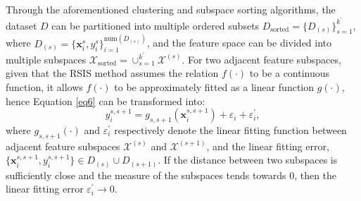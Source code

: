 \documentclass[final,3p,times]{elsarticle}
\begin{document}
Through the aforementioned clustering and subspace sorting 
algorithms, the dataset $D$ can be partitioned into multiple 
ordered subsets $D_{\text{sorted}}=\{D_{(s)}\}_{s=1}^{k^\prime}$, 
where $D_{(s)}=\{ \boldsymbol{x}_i^s,y_i^s \}_{i=1}^{\text{num}
(D_{(s)})}$, and the feature space can be divided into multiple 
subspaces $\mathcal{X}_{\text{sorted}}=\cup_{s=1}^{k^\prime}\mathcal{X}^{(s)}$. For 
two adjacent feature subspaces, given that the RSIS method assumes 
the relation $f(\cdot)$ to be a continuous function, it allows 
$f(\cdot)$ to be approximately fitted as a linear function 
$g(\cdot)$, hence Equation \eqref{eq6} can be transformed into: 
\begin{equation} 
\label{eq7}
y_i^{s,s+1}=g_{s,s+1}(\boldsymbol{x}_i^{s,s+1})+\varepsilon_i+
\varepsilon_i^\prime, 
\end{equation}
where $g_{s,s+1}(\cdot)$ and $\varepsilon_i^\prime$ respectively 
denote the linear fitting function between adjacent feature 
subspaces $\mathcal{X}^{(s)}$ and $\mathcal{X}^{(s+1)}$, and the linear 
fitting error, $\{\boldsymbol{x}_i^{s,s+1},y_i^{s,s+1}\}\in D_{(s)}\cup 
D_{(s+1)}$. If the distance between two subspaces is sufficiently 
close and the measure of the subspaces tends towards $0$, then the 
linear fitting error $\varepsilon_i^\prime\rightarrow0$.
\end{document}
